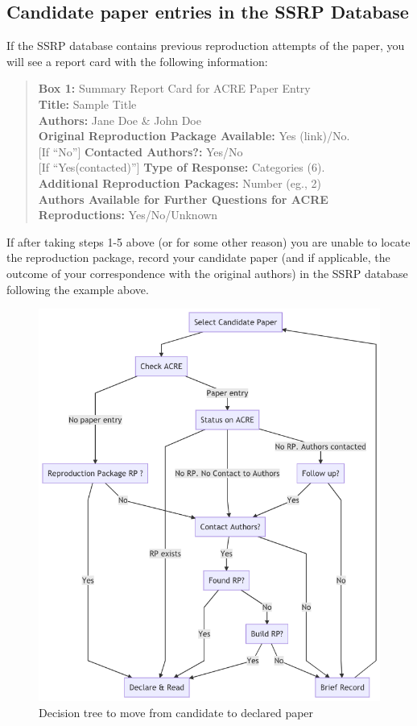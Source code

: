 \documentclass[
]{book}
\begin{document}
\hypertarget{check-acre}{%
\subsection{Candidate paper entries in the SSRP Database}\label{check-acre}}

If the SSRP database contains previous reproduction attempts of the paper, you will see a report card with the following information:

\begin{quote}
\textbf{Box 1:} Summary Report Card for ACRE Paper Entry\\
\textbf{Title:} Sample Title\\
\textbf{Authors:} Jane Doe \& John Doe\\
\textbf{Original Reproduction Package Available:} Yes (link)/No.\\
{[}If ``No''{]} \textbf{Contacted Authors?:} Yes/No\\
{[}If ``Yes(contacted)''{]} \textbf{Type of Response:} Categories (6).\\
\textbf{Additional Reproduction Packages:} Number (eg., 2)\\
\textbf{Authors Available for Further Questions for ACRE Reproductions:} Yes/No/Unknown
\end{quote}

If after taking steps 1-5 above (or for some other reason) you are unable to locate the reproduction package, record your candidate paper (and if applicable, the outcome of your correspondence with the original authors) in the SSRP database following the example above.

\begin{figure}
\includegraphics[width=0.8\linewidth]{candidate-to-declared-paper} \caption{Decision tree to move from candidate to declared paper}\label{fig:candidate-paper-dec-tree}
\end{figure}
\end{document}

